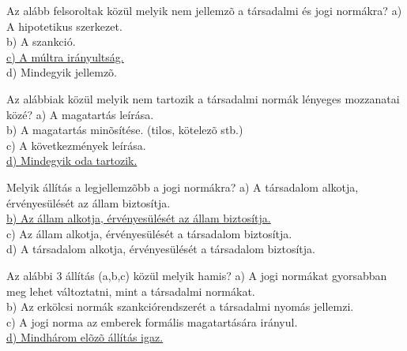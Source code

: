 \begin{frame}  

\begin{tcolorbox}[title={1. Kérdés}]
Az alább felsoroltak közül melyik nem jellemzõ a társadalmi és jogi normákra?
\tcblower
a) A hipotetikus szerkezet.\\
b) A szankció.\\
\uline {c) A múltra irányultság.}\\
d) Mindegyik jellemzõ.
\end{tcolorbox}

\begin{tcolorbox}[title={2. Kérdés}]
Az alábbiak közül melyik nem tartozik a társadalmi normák lényeges mozzanatai közé?
\tcblower
a) A magatartás leírása.\\
b) A magatartás minõsítése. (tilos, kötelezõ stb.)\\
c) A következmények leírása.\\
\uline {d) Mindegyik oda tartozik.}
\end{tcolorbox}

\begin{tcolorbox}[title={3. Kérdés}]
Melyik állítás a legjellemzõbb a jogi normákra?
\tcblower
a) A társadalom alkotja, érvényesülését az állam biztosítja.\\
\uline {b) Az állam alkotja, érvényesülését az állam biztosítja.}\\
c) Az állam alkotja, érvényesülését a társadalom biztosítja.\\
d) A társadalom alkotja, érvényesülését a társadalom biztosítja.
\end{tcolorbox}

\begin{tcolorbox}[title={4. Kérdés}]
Az alábbi 3 állítás (a,b,c) közül melyik hamis?
\tcblower
a) A jogi normákat gyorsabban meg lehet változtatni, mint a társadalmi normákat.\\
b) Az erkölcsi normák szankciórendszerét a társadalmi nyomás jellemzi.\\
c) A jogi norma az emberek formális magatartására irányul.\\
\uline {d) Mindhárom elõzõ állítás igaz.}
\end{tcolorbox}

\end{frame}


